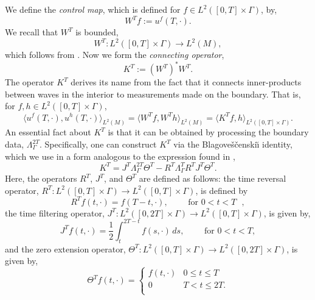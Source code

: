 \documentclass[final,leqno]{siamart1116}
\begin{document}
We define the \emph{control map}, which
is defined for $f \in L^2([0,T] \times \Gamma)$, by,
\begin{equation}
    W^Tf := u^f(T,\cdot).
\end{equation}
We recall that $W^T$ is bounded,
\begin{equation}
  W^T : L^2([0,T] \times \Gamma) \rightarrow L^2(M),
\end{equation}
which follows from \cite{Lasiecka1991}.
Now we form
the \emph{connecting operator},
\begin{equation}
  K^T := (W^T)^*W^T.
\end{equation}
The operator $K^T$ derives its name from the fact that it connects
inner-products between waves in the interior to measurements made on
the boundary. That is, for $f,h \in L^2([0,T] \times \Gamma)$,
\begin{equation}
  \langle u^f(T,\cdot),u^h(T,\cdot) \rangle_{L^2(M)} = \langle W^T f, W^Th \rangle_{L^2(M)} = \langle K^T f,h \rangle_{L^2([0,T] \times \Gamma)}.
\end{equation}
An essential fact about $K^T$ is that it can be obtained by processing
the boundary data, $\Lambda_{\Gamma}^{2T}$. Specifically, one can
construct $K^T$ via the Blagove{\v{s}}{\v{c}}enski{\u\i} identity, which
we use in a form analogous to the expression found in
\cite{Oksanen2013},
\begin{equation}
  \label{eqn:StandardBlagoIdentity}
  K^T =  J^T \Lambda^{2T}_{\Gamma} \Theta^T - R^T \Lambda^{T}_{\Gamma} R^T J^T \Theta^T.
\end{equation}
Here, the operators $R^T$, $J^T$, and $\Theta^T$ are defined as
follows: the time reversal operator,
$R^{T} : L^2([0,T] \times \Gamma) \rightarrow L^2([0,T] \times
\Gamma)$, is defined by
\begin{equation}
  R^T f (t, \cdot) = f(T - t, \cdot), \qquad \text{ for $0 < t < T$ },
\end{equation}
the time filtering operator,
$J^T : L^2([0,2T] \times \Gamma) \rightarrow L^2([0,T] \times
\Gamma)$, is given by,
\begin{equation}
  J^T f (t, \cdot) = \frac{1}{2} \int_t^{2T - t} f(s,\cdot) \,ds, \qquad \text{ for $0 < t < T$},
\end{equation}
and the zero extension operator,
$\Theta^T : L^2([0,T] \times \Gamma) \rightarrow L^2([0,2T] \times
\Gamma)$, is given by,
\begin{equation}
  \Theta^T f(t, \cdot) = \left\{
    \begin{array}{ll}
      f(t, \cdot) & 0 \leq t \leq T \\
      0 & T < t \leq 2T. \\ 
    \end{array}
  \right.
\end{equation}
\end{document}
